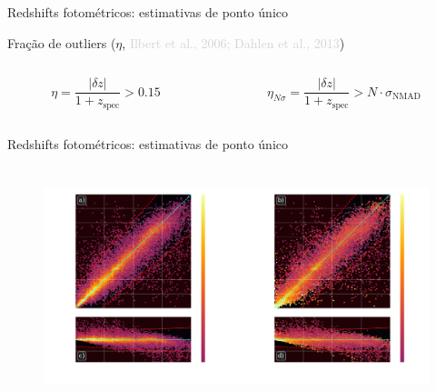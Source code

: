 \begin{frame}[c]{Redshifts fotométricos: estimativas de ponto único}
    \begin{splusbox}{Fração de outliers ($\eta${, {\textcolor{LightGray}{Ilbert et al., 2006; Dahlen et al., 2013}}})}
        \vspace{-.5cm}
        \begin{columns}[c]
            \begin{column}{0.46\textwidth}
                \centering
                \begin{equation*}
                    \eta = \frac{|\delta z|}{1+z_\text{spec}} > 0.15
                \end{equation*}
            \end{column}
            \begin{column}{0.46\textwidth}
                \centering
                \begin{equation*}
                    \eta_{N\sigma} = \frac{|\delta z|}{1+z_\text{spec}} > N \cdot \sigma_\text{NMAD}
                \end{equation*}
            \end{column}
            \hspace*{1cm}
        \end{columns}
    \end{splusbox}
\end{frame}

\begin{frame}[c]{Redshifts fotométricos: estimativas de ponto único}
    \begin{figure}
        \centering
        \includegraphics[height=7cm]{script/images/results_scatterplot_residuals.pdf}
    \end{figure}
\end{frame}

